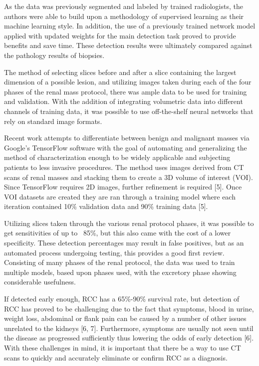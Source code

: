 \documentclass[10pt,journal,compsoc]{IEEEtran}
\begin{document}
As the data was previously segmented and labeled by trained radiologists, the authors were able to build upon a methodology of supervised learning as their machine learning style. In addition, the use of a previously trained network model applied with updated weights for the main detection task proved to provide benefits and save time. These detection results were ultimately compared against the pathology results of biopsies.


The method of selecting slices before and after a slice containing the largest dimension of a possible lesion, and utilizing images taken during each of the four phases of the renal mass protocol, there was ample data to be used for training and validation. With the addition of integrating volumetric data into different channels of training data, it was possible to use off-the-shelf neural networks that rely on standard image formats. 


Recent work attempts to differentiate between benign and malignant masses via Google’s TensorFlow software with the goal of automating and generalizing the method of characterization enough to be widely applicable and subjecting patients to less invasive procedures.   The method uses images derived from CT scans of renal masses and stacking them to create a 3D volume of interest (VOI).  Since TensorFlow requires 2D images, further refinement is required [5]. Once VOI datasets are created they are ran through a training model where each iteration contained 10\% validation data and 90\% training data [5].  

Utilizing slices taken through the various renal protocol phases, it was possible to get sensitivities of up to ~85\%, but this also came with the cost of a lower specificity. These detection percentages may result in false positives, but as an automated process undergoing testing, this provides a good first review.  Consisting of many phases of the renal protocol, the data was used to train multiple models, based upon phases used, with the excretory phase showing considerable usefulness. 


If detected early enough, RCC has a 65\%-90\% survival rate, but detection of RCC has proved to be challenging due to the fact that symptoms, blood in urine, weight loss, abdominal or flank pain can be caused by a number of other issues unrelated to the kidneys [6, 7]. Furthermore, symptoms are usually not seen until the disease as progressed sufficiently thus lowering the odds of early detection [6].  With these challenges in mind, it is important that there be a way to use CT scans to quickly and accurately eliminate or confirm RCC as a diagnosis.  
\end{document}
